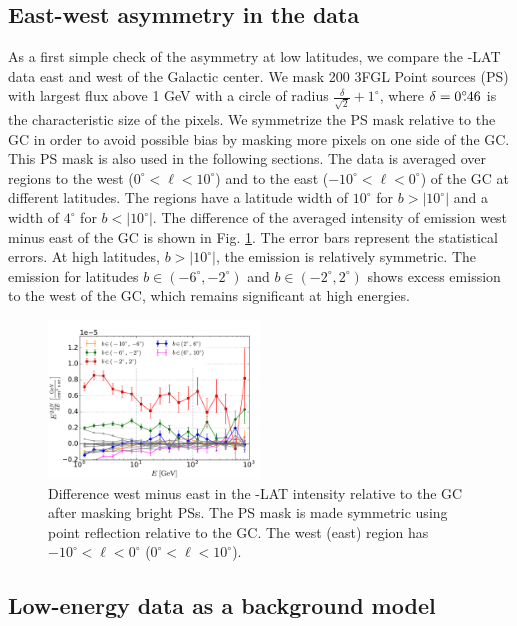 \subsection{East-west  asymmetry in the data}
\label{sec:data_diff}

As a first simple check of the asymmetry at low latitudes, we compare the \Fermi-LAT data east and west of the Galactic center. 
We mask 200 3FGL Point sources (PS)  with largest flux above 1 GeV
with a circle of radius $\frac{\delta}{\sqrt{2}} + 1^\circ$, where $\delta = 0^\circ\!\!.46$ is the characteristic size of the pixels. 
We symmetrize the PS mask relative to the GC in order to avoid possible bias by masking more pixels on one side of the GC. 
This PS mask is also used in the following sections. 
The data is averaged over regions to the west ($0^\circ < \ell < 10^\circ$) and to the east ($-10^\circ < \ell  <  0^\circ$) 
of the GC at different latitudes. The regions have a latitude width of $10^\circ$ for $b >|10^\circ|$ and a width of  $4^\circ$ for  $b <|10^\circ|$. 
The difference of the averaged intensity of emission west minus east of the GC is shown in Fig. \ref{fig:data_diff}. 
The error bars represent the statistical errors.
At high latitudes, $b >|10^\circ|$, the emission is relatively symmetric. 
The emission for latitudes $b \in (-6^\circ, -2^\circ)$ and $b \in (-2^\circ, 2^\circ)$ shows excess emission to the west of the GC, 
which remains significant at high energies. 


\begin{figure}[h]
\centering
 \includegraphics[width=0.5\textwidth]{plots/Difference_data_for_different_latitudes.pdf}
 \caption{Difference west minus east in the \Fermi-LAT intensity relative to the GC after masking bright PSs.
 The PS mask is made symmetric using point reflection relative to the GC.
 The west (east) region has $-10^\circ < \ell <0^\circ$ ($0^\circ < \ell <10^\circ$). }
 \label{fig:data_diff}
\end{figure}

\subsection{Low-energy data as a background model}
\label{sec:le_data_model}

